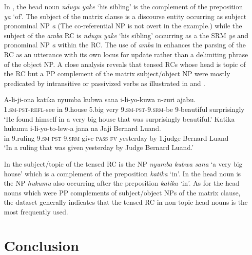 \documentclass[output=paper,colorlinks,citecolor=brown]{langscibook}
\begin{document}
In , the head noun \textit{ndugu yake} ‘his sibling’ is the complement of the preposition \textit{ya} ‘of’. The subject of the matrix clause is a discourse entity occurring as subject pronominal NP \textit{a} (The co-referential NP is not overt in the example.) while the subject of the \textit{amba} RC is \textit{ndugu yake} ‘his sibling’ occurring as a the SRM \textit{ye} and pronominal NP \textit{a} within the RC. The use of \textit{amba} in  enhances the parsing of the RC as an utterance with its own locus for update rather than a delimiting phrase of the object NP. A close analysis reveals that tensed RCs whose head is topic of the RC but a PP complement of the matrix subject/object NP were mostly predicated by intransitive or passivized verbs as illustrated in  and .

\ea%
    \label{ex:mwamzandi:31}
    \gll    A-li-ji-ona katika nyumba kubwa sana i-li-yo-kuwa n-zuri ajabu.\\
            \textsc{1.sm-pst-refl-}see in 9.house 5.big very \textsc{9.sm-pst-9.srm-}be 9-beautiful surprisingly\\
    \glt    ‘He found himself in a very big house that was surprisingly beautiful.’
\ex%
    \label{ex:mwamzandi:32}
    \gll    Katika hukumu i-li-yo-to-lew-a jana na Jaji Bernard Luand.\\
            in 9.ruling \textsc{9.sm-pst-9.srm-}give\textsc{-pass-fv} yesterday by 1.judge Bernard Luand\\
    \glt    ‘In a ruling that was given yesterday by Judge Bernard Luand.’
\z

In  the subject/topic of the tensed RC is the NP \textit{nyumba kubwa sana} ‘a very big house’ which is a complement of the preposition \textit{katika} ‘in’. In  the head noun is the NP \textit{hukumu} also occurring after the preposition \textit{katika} ‘in’. As for the head nouns which were PP complements of subject/object NPs of the matrix clause, the dataset generally indicates that the tensed RC in non-topic head nouns is the most frequently used.

\section{Conclusion}\label{sec:mwamzandi:5}
\end{document}
